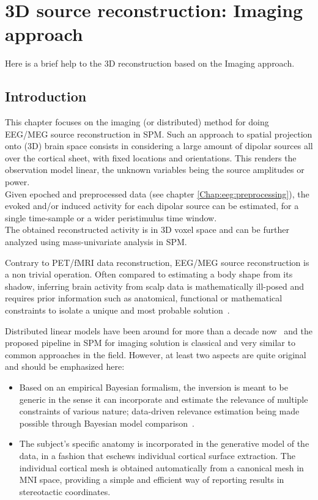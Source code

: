 \chapter{3D source reconstruction: Imaging approach \label{Chap:eeg:imaging}}

Here is a brief help to the 3D reconstruction based on the Imaging approach.

\section{Introduction}
\label{sec:imaginv_intro}
This chapter focuses on the imaging (or distributed) method for doing 
EEG/MEG source reconstruction in SPM.
Such an approach to spatial projection onto (3D) brain space consists
in considering a large amount of dipolar sources all over the cortical sheet, 
with fixed locations and orientations. This renders the observation model linear, 
the unknown variables being the source amplitudes or power.\\
Given epoched and preprocessed data (see chapter \ref{Chap:eeg:preprocessing}), the evoked and/or induced
activity for each dipolar source can be estimated, for a single time-sample or a 
wider peristimulus time window.\\
The obtained reconstructed activity is in 3D voxel space and can be further analyzed using mass-univariate analysis in SPM.

Contrary to PET/fMRI data reconstruction, EEG/MEG source reconstruction 
is a non trivial operation. Often compared to estimating a body shape from 
its shadow, inferring brain activity from scalp data is mathematically ill-posed 
and requires prior information such as anatomical, functional or mathematical
constraints to isolate a unique and most probable solution~\cite{Baillet01}.

Distributed linear models have been around for more than a decade now~\cite{Dale93}
and the proposed pipeline in SPM for imaging solution is classical and very similar
to common approaches in the field. However, at least two aspects are quite original 
and should be emphasized here:

\begin{itemize}
\item Based on an empirical Bayesian formalism, the inversion is meant 
to be generic in the sense it can incorporate and estimate the relevance
of multiple constraints of various nature; data-driven relevance estimation 
being made possible through Bayesian model 
comparison~\cite{peb1,cp_empirical_eeg,jm_multiple,karl_induced}.
\item The subject's specific anatomy is incorporated in the generative model
of the data, in a fashion that eschews individual cortical surface extraction.
The individual cortical mesh is obtained automatically from a canonical mesh in 
MNI space, providing a simple and efficient way of reporting results in stereotactic coordinates.
\end{itemize}


